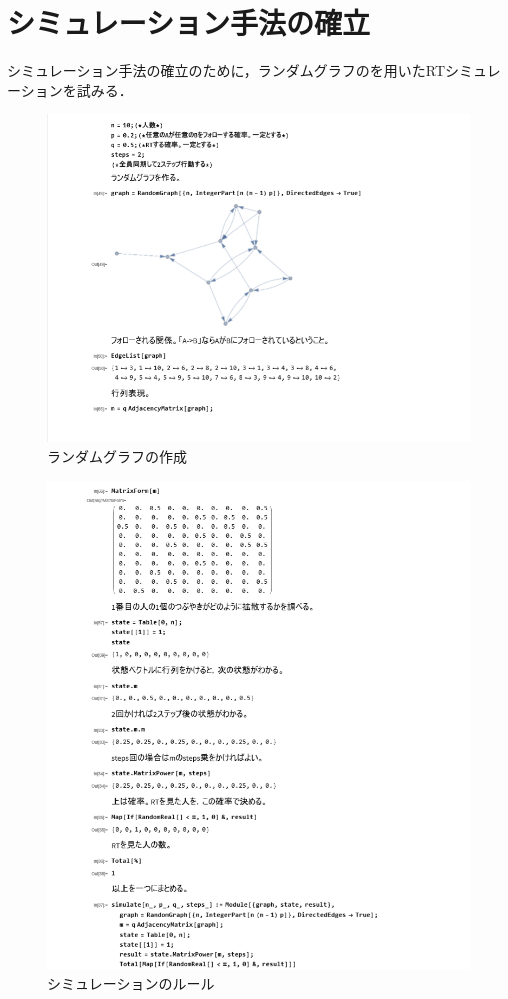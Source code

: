 \section{シミュレーション手法の確立}

シミュレーション手法の確立のために，ランダムグラフのを用いたRTシミュレーションを試みる．

\begin{figure}[h]
\centering
\includegraphics[width=13cm]{syuhou1.png}
\caption{ランダムグラフの作成}\label{グラフ}
\end{figure}

\newpage

\begin{figure}[h]
\centering
\includegraphics[width=13cm]{syuhou2.png}
\caption{シミュレーションのルール}\label{ルール}
\end{figure}

